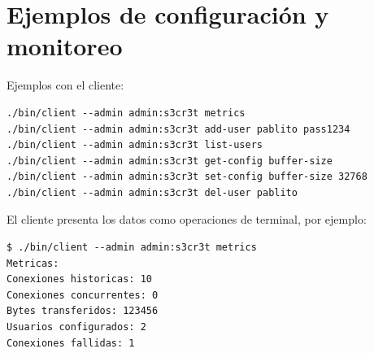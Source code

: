 \section{Ejemplos de configuración y monitoreo}

Ejemplos con el cliente:
\begin{verbatim}
./bin/client --admin admin:s3cr3t metrics
./bin/client --admin admin:s3cr3t add-user pablito pass1234
./bin/client --admin admin:s3cr3t list-users
./bin/client --admin admin:s3cr3t get-config buffer-size
./bin/client --admin admin:s3cr3t set-config buffer-size 32768
./bin/client --admin admin:s3cr3t del-user pablito
\end{verbatim}

El cliente presenta los datos como operaciones de terminal, por ejemplo:
\begin{verbatim}
$ ./bin/client --admin admin:s3cr3t metrics
Metricas:
Conexiones historicas: 10
Conexiones concurrentes: 0
Bytes transferidos: 123456
Usuarios configurados: 2
Conexiones fallidas: 1
\end{verbatim}
